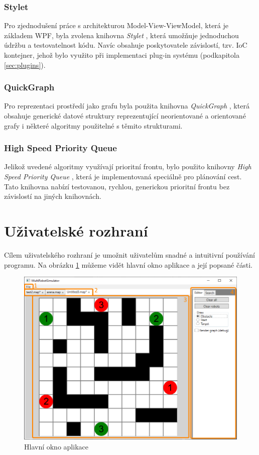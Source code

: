 \subsubsection{Stylet}
Pro zjednodušení práce s architekturou Model-View-ViewModel, která je základem WPF, byla zvolena knihovna \emph{Stylet} \cite{Stylet}, která umožňuje jednoduchou údržbu a testovatelnost kódu. Navíc obsahuje poskytovatele závislostí, tzv. IoC kontejner, jehož bylo využito při implementaci plug-in systému (podkapitola \ref{sec:plugins}).

\subsubsection{QuickGraph}
Pro reprezentaci prostředí jako grafu byla použita knihovna \emph{QuickGraph} \cite{QuickGraph}, která obsahuje generické datové struktury reprezentující neorientované a orientované grafy i některé algoritmy použitelné s těmito strukturami.

\subsubsection{High Speed Priority Queue}
Jelikož uvedené algoritmy využívají prioritní frontu, bylo použito knihovny \emph{High Speed Priority Queue} \cite{HSPQ}, která je implementovaná speciálně pro plánování cest. Tato knihovna nabízí testovanou, rychlou, generickou prioritní frontu bez závislostí na jiných knihovnách.

\section{Uživatelské rozhraní}
Cílem uživatelského rozhraní je umožnit uživatelům snadné a intuitivní používání programu. Na obrázku \ref{obr:gui} můžeme vidět hlavní okno aplikace a její popsané části.

\begin{figure}[htb]
	\begin{center}
		\includegraphics*[width=\textwidth,keepaspectratio]{obr/gui}
	\end{center}
	\caption[caption]{Hlavní okno aplikace}
	\label{obr:gui}
\end{figure}

